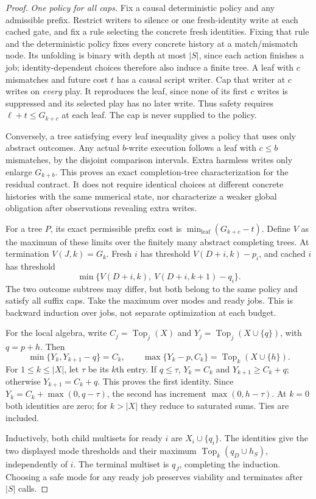\documentclass[acmsmall,screen,review,anonymous]{acmart}
\begin{document}
\begin{proof}
\emph{One policy for all caps.} Fix a causal deterministic policy and any admissible prefix. Restrict writers to silence or one fresh-identity write at each cached gate, and fix a rule selecting the concrete fresh identities. Fixing that rule and the deterministic policy fixes every concrete history at a match/mismatch node. Its unfolding is binary with depth at most $|S|$, since each action finishes a job; identity-dependent choices therefore also induce a finite tree. A leaf with $c$ mismatches and future cost $t$ has a causal script writer. Cap that writer at $c$ writes on \emph{every} play. It reproduces the leaf, since none of its first $c$ writes is suppressed and its selected play has no later write. Thus safety requires $\ell+t\le G_{k+c}$ at each leaf. The cap is never supplied to the policy.

Conversely, a tree satisfying every leaf inequality gives a policy that uses only abstract outcomes. Any actual $b$-write execution follows a leaf with $c\le b$ mismatches, by the disjoint comparison intervals. Extra harmless writes only enlarge $G_{k+b}$. This proves an exact completion-tree characterization for the residual contract. It does not require identical choices at different concrete histories with the same numerical state, nor characterize a weaker global obligation after observations revealing extra writes.

For a tree $P$, its exact permissible prefix cost is $\min_{\text{leaf}}(G_{k+c}-t)$. Define $V$ as the maximum of these limits over the finitely many abstract completing trees. At termination $V(J,k)=G_k$. Fresh $i$ has threshold $V(D+i,k)-p_i$, and cached $i$ has threshold
\[
 \min\{V(D+i,k),\ V(D+i,k+1)-q_i\}.
\]
The two outcome subtrees may differ, but both belong to the same policy and satisfy all suffix caps. Take the maximum over modes and ready jobs. This is backward induction over jobs, not separate optimization at each budget.

For the local algebra, write $C_j=\operatorname{Top}_j(X)$ and $Y_j=\operatorname{Top}_j(X\cup\{q\})$, with $q=p+h$. Then
\[
 \min\{Y_k,Y_{k+1}-q\}=C_k,\qquad
 \max\{Y_k-p,C_k\}=\operatorname{Top}_k(X\cup\{h\}).
\]
For $1\le k\le|X|$, let $\tau$ be its $k$th entry. If $q\le\tau$, $Y_k=C_k$ and $Y_{k+1}\ge C_k+q$; otherwise $Y_{k+1}=C_k+q$. This proves the first identity. Since $Y_k=C_k+\max(0,q-\tau)$, the second has increment $\max(0,h-\tau)$. At $k=0$ both identities are zero; for $k>|X|$ they reduce to saturated sums. Ties are included.

Inductively, both child multisets for ready $i$ are $X_i\cup\{q_i\}$. The identities give the two displayed mode thresholds and their maximum $\operatorname{Top}_k(q_D\cup h_S)$, independently of $i$. The terminal multiset is $q_J$, completing the induction. Choosing a safe mode for any ready job preserves viability and terminates after $|S|$ calls.
\end{proof}
\end{document}
